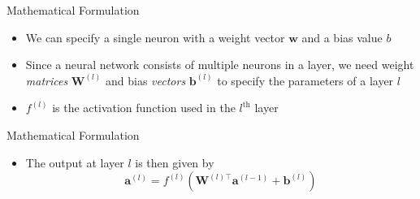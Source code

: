 \documentclass{beamer}
\newcommand{\nth}[1]{$#1^\text{th}$}
\begin{document}
	\begin{frame}{Mathematical Formulation}
		\begin{itemize}
			\item <1-> We can specify a single neuron with a weight vector $\bm{w}$ and a bias value $b$
			\item <2-> Since a neural network consists of multiple neurons in a layer, we need weight \emph{matrices} $\bm{W}^{(l)}$ and bias \emph{vectors} $\bm{b}^{(l)}$ to specify the parameters of a layer $l$
			\item <3-> $f^{(l)}$ is the activation function used in the \nth{l} layer
		\end{itemize}
	\end{frame}
	\begin{frame}{Mathematical Formulation}
		\begin{itemize}
			\item <1-> The output at layer $l$ is then given by
			\begin{equation}
				\bm{a}^{(l)} = f^{(l)}\left(\bm{W}^{(l)\top}\bm{a}^{(l-1)}+\bm{b}^{(l)}\right)
			\end{equation}
		\end{itemize}
	\end{frame}
	
\end{document}
